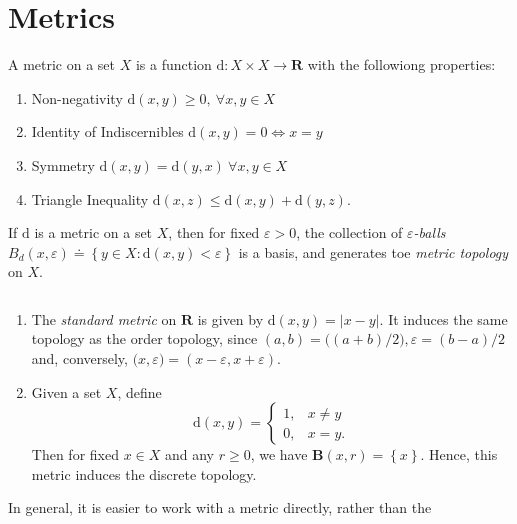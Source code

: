 \section{Metrics}
\begin{definition}
\label{def:metric}
A metric on a set \(X\) is a function \(\mathrm{d}: X \times X \to \mathbf{R}\)
with the followiong properties:
\begin{enumerate}
  \item{Non-negativity} \(\mathrm{d}(x,y) \ge 0, \ \forall x,y \in X\)
  \item{Identity of Indiscernibles} \(\mathrm{d}(x,y) = 0 \iff x=y\)
  \item{Symmetry} \(\mathrm{d}(x,y) = \mathrm{d}(y,x) \ \forall x,y \in X\)
  \item{Triangle Inequality} \(\mathrm{d}(x,z) \le \mathrm{d}(x,y) +
  \mathrm{d}(y,z)\).
\end{enumerate}
\end{definition}
\begin{definition}
\label{def:metric-topology}
If \(\mathrm{d}\) is a metric on a set \(X\), then for fixed \(\varepsilon >
0\),  the collection of \emph{\(\varepsilon\)-balls} \(B_{d}(x, \varepsilon)
\doteq \left\{ y \in X:
\mathrm{d}(x,y) < \varepsilon \right\}\) is a basis, and generates toe
\emph{metric topology} on \(X\).
\end{definition}
\begin{example} \(\)
\begin{enumerate}
  \item The \emph{standard metric} on \( \mathbf{R} \)
  is given by \( \mathrm{d}(x,y) =
  |x-y| \). It induces the same topology as the order topology,
  since
  \( (a,b) = \mathbf((a+b)/2), \varepsilon = (b-a)/2 \) and,
  conversely, \( \mathbf(x,\varepsilon) =
  (x - \varepsilon, x + \varepsilon) \).
  \item Given a set \(X\), define
  \begin{equation*}
\mathrm{d}(x,y) = \begin{cases}
1, & x \neq y \\
0, & x = y.
\end{cases}
\end{equation*}
Then for fixed \(x \in X\) and any \(r \ge 0\), we have
\(\mathbf{B}(x, r) = \left\{ x \right\}\). Hence, this metric
induces the discrete topology.
\end{enumerate}
\end{example}
In general, it is easier to work with a metric directly, rather than the
